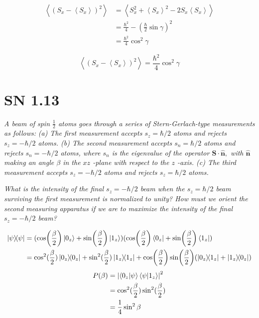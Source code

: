 \documentclass{article}
\begin{document}
\begin{align*}
    \left\langle\left(S_{x}-\left\langle S_{x}\right\rangle\right)^{2}\right\rangle &= \left\langle S_{x}^2 +\left\langle S_{x}\right\rangle^2 - 2S_{x}\left\langle S_{x}\right\rangle\right\rangle\\
    &= \frac{\hbar^2}{4}-\left( \frac{\hbar}{2} \sin \gamma \right)^{2}\\
    &= \frac{\hbar^2}{4} \cos^2 \gamma
\end{align*}


\begin{equation*}
    \boxed{\left\langle\left(S_{x}-\left\langle S_{x}\right\rangle\right)^{2}\right\rangle = \frac{\hbar^2}{4} \cos^2 \gamma}
\end{equation*}

\newpage


\section{SN 1.13}
\textit{A beam of spin $\frac{1}{2}$ atoms goes through a series of Stern-Gerlach-type measurements as follows:}
\textit{\newline (a) The first measurement accepts $s_{z}=\hbar / 2$ atoms and rejects $s_{z}=-\hbar / 2$ atoms.
\newline(b) The second measurement accepts $s_{n}=\hbar / 2$ atoms and rejects $s_{n}=-\hbar / 2$ atoms, where $s_{n}$ is the eigenvalue of the operator $\mathbf{S} \cdot \hat{\mathbf{n}},$ with $\hat{\mathbf{n}}$ making an angle $\beta$ in the $x z$ -plane with respect to the $z$ -axis.
\newline(c) The third measurement accepts $s_{z}=-\hbar / 2$ atoms and rejects $s_{z}=\hbar / 2$ atoms.}

\textit{What is the intensity of the final $s_{z}=-\hbar / 2$ beam when the $s_{z}=\hbar / 2$ beam surviving the first measurement is normalized to unity? How must we orient the second measuring apparatus if we are to maximize the intensity of the final $s_{z}=-\hbar / 2$ beam?}

\begin{align*}
    \ketbra{\psi} &= (\cos (\frac{\beta }{2}) \ket{0_z} + \sin (\frac{\beta }{2}) \ket{1_z})(\cos (\frac{\beta }{2}) \bra{0_z} + \sin (\frac{\beta }{2}) \bra{1_z})\\
    &= \cos^2 (\frac{\beta }{2}) \ketbra{0_z} + \sin^2 (\frac{\beta }{2}) \ketbra{1_z}+\cos (\frac{\beta }{2})\sin (\frac{\beta }{2})( \ketbra{0_z}{1_z}+ \ketbra{1_z}{0_z}) \\
\end{align*}
\begin{align*}
P(\beta) &= \left| \braket{0_z}{\psi}\braket{\psi}{1_z}\right|^2 \\
&= \cos^2 (\frac{\beta }{2})\sin^2 (\frac{\beta }{2})\\ 
&= \frac{1}{4}\sin^2 \beta
\end{align*}
\end{document}
